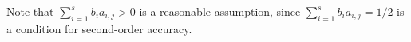 \documentclass{report}
\newcommand{\inner}[2]{\left< #1 , #2 \right>}
\begin{document}
    \vspace*{10mm}
    Note that \(\sum_{i=1}^{s}b_{i}a_{i,j}>0\) is a reasonable assumption,
    since \(\sum_{i=1}^{s}b_{i}a_{i,j}=1/2\) is a condition for second-order accuracy.

\end{document}
